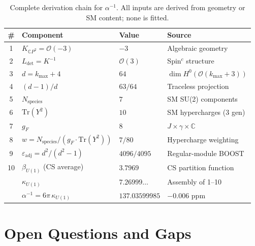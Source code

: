 \documentclass[12pt,a4paper]{article}
\begin{document}
\begin{table}[h]
\centering
\caption{Complete derivation chain for $\alpha^{-1}$.  All inputs are
derived from geometry or SM content; none is fitted.}
\label{tab:chain}
\renewcommand{\arraystretch}{1.3}
\begin{tabular}{clll}
\toprule
\# & \textbf{Component} & \textbf{Value} & \textbf{Source} \\
\midrule
1 & $K_{\mathbb{C}P^2} = \mathcal{O}(-3)$ & $-3$ & Algebraic geometry \\
2 & $L_{\det} = K^{-1}$ & $\mathcal{O}(3)$ & Spin$^c$ structure \\
3 & $d = k_{\max} + 4$ & $64$ & $\dim H^0(\mathcal{O}(k_{\max}+3))$ \\
4 & $(d-1)/d$ & $63/64$ & Traceless projection \\
5 & $N_{\mathrm{species}}$ & $7$ & SM SU(2) components \\
6 & $\mathrm{Tr}(Y^2)$ & $10$ & SM hypercharges (3 gen) \\
7 & $g_F$ & $8$ & $J \times \gamma \times \mathbb{C}$ \\
8 & $w = N_{\mathrm{species}}/(g_F \cdot \mathrm{Tr}(Y^2))$ & $7/80$ & Hypercharge weighting \\
9 & $\varepsilon_{\mathrm{adj}} = d^2/(d^2-1)$ & $4096/4095$ & Regular-module BOOST \\
10 & $\beta_{U(1)}$ (CS average) & $3.7969$ & CS partition function \\
\midrule
& $\kappa_{U(1)}$ & $7.26999\ldots$ & Assembly of 1--10 \\
& $\alpha^{-1} = 6\pi\,\kappa_{U(1)}$ & $137.03599985$ & $-0.006$ ppm \\
\bottomrule
\end{tabular}
\end{table}

\section{Open Questions and Gaps}
\label{sec:gaps}
\end{document}
